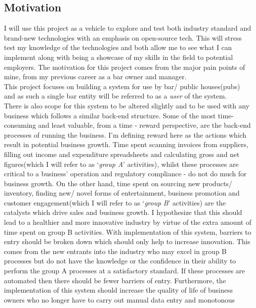 \begin{flushleft}
	\subsection{Motivation}
	I will use this project as a vehicle to explore and test both industry standard and brand-new technologies with an emphasis on open-source tech. This will stress test my knowledge of the
	technologies and both allow me to see what I can implement along with being a showcase of my skills in the field to potential employers. \newline
	The motivation for this project comes from the major pain points of mine, from my previous career as a bar owner and manager. \\ This project focuses on building a system for use by 
	bar/ public houses(pubs) and as such a single bar entity will be referred to as a \emph{user} of the system.\\
	There is also scope for this system to be altered slightly and to be used with any business which follows a similar back-end structure.
	\bigbreak
	Some of the most time-consuming and least valuable, from a time - reward perspective, are the back-end processes of running the business. I'm defining reward here as the actions which result
	in potential business growth. Time spent scanning invoices from suppliers, filling out income and expenditure spreadsheets and calculating gross and net figures(which I will refer to 
	as ‘\emph{group A}’ activities), whilst these processes are critical to a business’ operation and regulatory compliance - do not do much for business growth. 
	On the other hand, time spent on sourcing new products/ inventory, finding new/ novel forms of entertainment, business promotion and customer engagement(which I will refer to as 
	‘\emph{group B}’ activities) are the catalysts which drive sales and business growth.
	\bigbreak
	I hypothesize that this should lead to a healthier and more innovative industry by virtue of the extra amount of time spent on group B activities. With implementation of this system,
	barriers to entry should be broken down which should only help to increase innovation. This comes from the new entrants into the industry who may excel in group B processes but do not have 
	the knowledge or the confidence in their ability to perform the group A processes at a satisfactory standard. If these processes are automated then there should be fewer barriers of entry.
	Furthermore, the implementation of this system should increase the quality of life of business owners who no longer have to carry out manual data entry and monotonous 

\end{flushleft}
